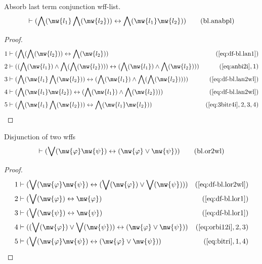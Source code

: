 \begin{lemma} Absorb last term conjunction wff-list.
\begin{align}
\vdash ( \bigwedge( \mw{l_1} \bigwedge( \mw{l_2} ) ) \leftrightarrow \bigwedge(
    \mw{l_1} \mw{l_2} ) )\label{eq:bl.anabpl}\tag{bl.anabpl}
\end{align}
\end{lemma}

\begin{proof}
\begin{align}
  1 & \vdash ( \bigwedge( \bigwedge( \mw{l_2} ) ) \leftrightarrow
    \bigwedge( \mw{l_2} )
    )&(\mbox{\ref{eq:df-bl.lan1}})\notag
  \\ 2 & \vdash ( ( \bigwedge( \mw{l_1} ) \wedge \bigwedge( \bigwedge(
    \mw{l_2} ) ) ) \leftrightarrow ( \bigwedge( \mw{l_1}
    ) \wedge \bigwedge( \mw{l_2} ) )
    )&(\mbox{\ref{eq:anbi2i}},1)\notag
  \\ 3 & \vdash ( \bigwedge( \mw{l_1} \bigwedge( \mw{l_2} ) )
    \leftrightarrow ( \bigwedge( \mw{l_1} ) \wedge
    \bigwedge( \bigwedge( \mw{l_2} ) ) )
    )&(\mbox{\ref{eq:df-bl.lan2wl}})\notag
  \\ 4 & \vdash ( \bigwedge( \mw{l_1} \mw{l_2} ) \leftrightarrow (
    \bigwedge( \mw{l_1} ) \wedge \bigwedge( \mw{l_2} ) )
    )&(\mbox{\ref{eq:df-bl.lan2wl}})\notag
  \\ 5 & \vdash ( \bigwedge( \mw{l_1} \bigwedge( \mw{l_2} ) )
    \leftrightarrow \bigwedge( \mw{l_1} \mw{l_2} )
    )&(\mbox{\ref{eq:3bitr4i}},2,3,4)\notag
\end{align}
\end{proof}

\begin{lemma} Disjunction of two wffs
\begin{align}
\vdash ( \bigvee( \mw{\varphi} \mw{\psi} ) \leftrightarrow ( \mw{\varphi} \vee \mw{\psi} )
    )\label{eq:bl.or2wl}\tag{bl.or2wl}
\end{align}
\end{lemma}

\begin{proof}
\begin{align}
  1 & \vdash ( \bigvee( \mw{\varphi} \mw{\psi} ) \leftrightarrow ( \bigvee( \mw{\varphi} )
    \vee \bigvee( \mw{\psi} ) )
    )&(\mbox{\ref{eq:df-bl.lor2wl}})\notag
  \\ 2 & \vdash ( \bigvee( \mw{\varphi} ) \leftrightarrow \mw{\varphi}
    )&(\mbox{\ref{eq:df-bl.lor1}})\notag
  \\ 3 & \vdash ( \bigvee( \mw{\psi} ) \leftrightarrow \mw{\psi}
    )&(\mbox{\ref{eq:df-bl.lor1}})\notag
  \\ 4 & \vdash ( ( \bigvee( \mw{\varphi} ) \vee \bigvee( \mw{\psi} ) )
    \leftrightarrow ( \mw{\varphi} \vee \mw{\psi} )
    )&(\mbox{\ref{eq:orbi12i}},2,3)\notag
  \\ 5 & \vdash ( \bigvee( \mw{\varphi} \mw{\psi} ) \leftrightarrow ( \mw{\varphi} \vee
    \mw{\psi} ) )&(\mbox{\ref{eq:bitri}},1,4)\notag
\end{align}
\end{proof}

